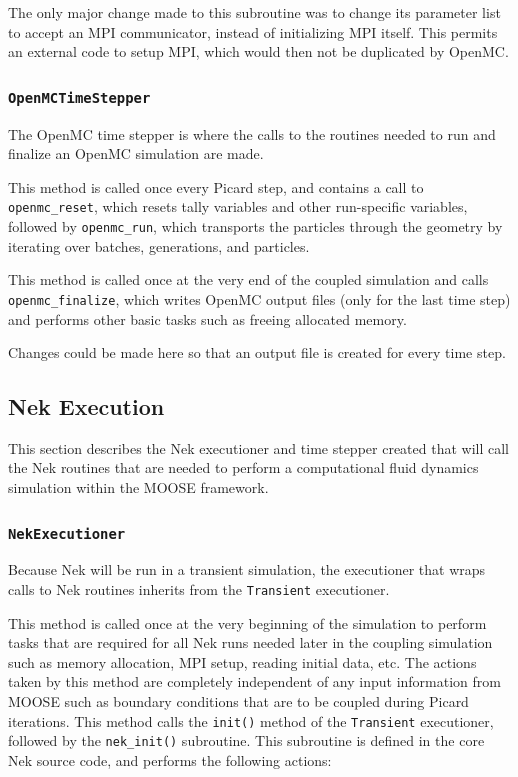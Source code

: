 \documentclass[10pt]{article}
\newcounter{subsubsubsection}[subsubsection]
\numberwithin{equation}{section} %
\begin{document}
The only major change made to this subroutine was to change its parameter list to accept an MPI communicator, instead of initializing MPI itself. This permits an external code to setup MPI, which would then not be duplicated by OpenMC.

\subsubsection{{\tt OpenMCTimeStepper}}
The OpenMC time stepper is where the calls to the routines needed to run and finalize an OpenMC simulation are made.

This method is called once every Picard step, and contains a call to {\tt openmc\_reset}, which resets tally variables and other run-specific variables, followed by {\tt openmc\_run}, which transports the particles through the geometry by iterating over batches, generations, and particles. 

This method is called once at the very end of the coupled simulation and calls {\tt openmc\_finalize}, which writes OpenMC output files (only for the last time step) and performs other basic tasks such as freeing allocated memory.

\color{magenta}
Changes could be made here so that an output file is created for every time step.
\color{black}

\subsection{Nek Execution}
This section describes the Nek executioner and time stepper created that will call the Nek routines that are needed to perform a computational fluid dynamics simulation within the MOOSE framework.

\subsubsection{{\tt NekExecutioner}}
Because Nek will be run in a transient simulation, the executioner that wraps calls to Nek routines inherits from the {\tt Transient} executioner.

This method is called once at the very beginning of the simulation to perform tasks that are required for all Nek runs needed later in the coupling simulation such as memory allocation, MPI setup, reading initial data, etc. The actions taken by this method are completely independent of any input information from MOOSE such as boundary conditions that are to be coupled during Picard iterations. This method calls the {\tt init()} method of the {\tt Transient} executioner, followed by the {\tt nek\_init()} subroutine. This subroutine is defined in the core Nek source code, and performs the following actions:
\end{document}
